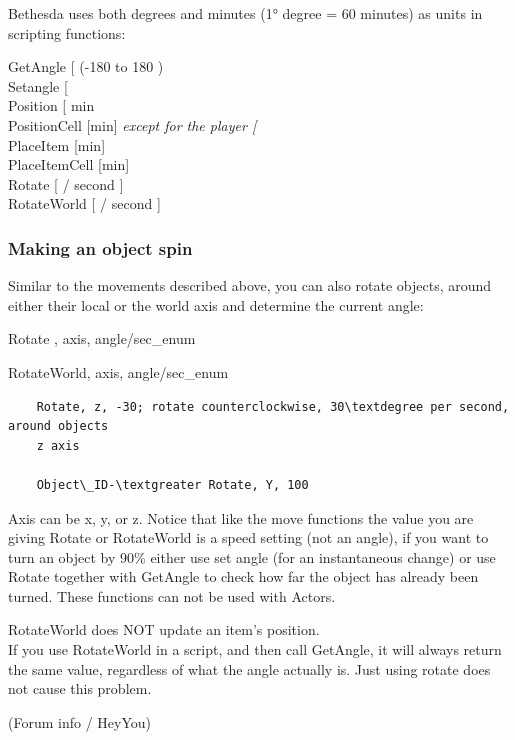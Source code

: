 Bethesda uses both degrees and minutes (1° degree = 60 minutes) as units in scripting functions:

	GetAngle {[}\textdegree{]} (-180 to 180 \textdegree)\\
	Setangle {[}\textdegree{]}\\
	Position {[} min \textdegree{]}\\
	PositionCell {[}min{]} \emph{except for the player {[}\textdegree{]}}\\
	PlaceItem {[}min{]}\\
	PlaceItemCell {[}min{]}\\
	Rotate {[} \textdegree / second {]}\\
	RotateWorld {[} \textdegree / second {]}

\hypertarget{making-an-object-spin}{%
\subsubsection{Making an object spin}\label{making-an-object-spin}}

Similar to the movements described above, you can also rotate objects,
around either their local or the world axis and determine the current
angle:


	Rotate , axis, angle/sec\_enum
	
	RotateWorld, axis, angle/sec\_enum

\begin{lstlisting}	
	Rotate, z, -30; rotate counterclockwise, 30\textdegree per second, around objects
	z axis
	
	Object\_ID-\textgreater Rotate, Y, 100
\end{lstlisting}

Axis can be x, y, or z. Notice that like the move functions the value
you are giving Rotate or RotateWorld is a speed setting (not an angle),
if you want to turn an object by 90\% either use set angle (for an
instantaneous change) or use Rotate together with GetAngle to check how
far the object has already been turned. These functions can not be used
with Actors.

RotateWorld does NOT update an item's position.\\
If you use RotateWorld in a script, and then call GetAngle, it will
always return the same value, regardless of what the angle actually is.
Just using rotate does not cause this problem.

(Forum info / HeyYou)

